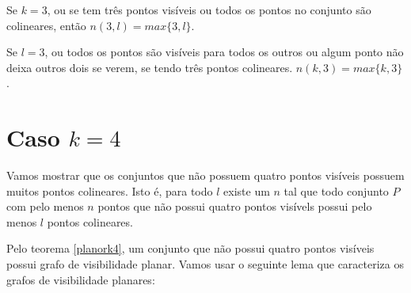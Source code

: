\documentclass[a4paper]{book}
\begin{document}
Se $k=3$, ou se tem três pontos visíveis ou todos os pontos no conjunto são colineares, então $n(3,l)=max\{3,l\}$.

Se $l=3$, ou todos os pontos são visíveis para todos os outros ou algum ponto não deixa outros dois se verem, se tendo três pontos colineares. $n(k,3) = max\{k,3\}$.


\section{Caso $k=4$}
Vamos mostrar que os conjuntos que não possuem quatro pontos visíveis possuem muitos pontos colineares. Isto é, para todo $l$ existe um $n$ tal que todo conjunto $P$ com pelo menos $n$ pontos que não possui quatro pontos visívels possui pelo menos $l$ pontos colineares.

Pelo teorema \ref{planork4}, um conjunto que não possui quatro pontos visíveis possui grafo de visibilidade planar. Vamos usar o seguinte lema que caracteriza os grafos de visibilidade planares:
\end{document}
